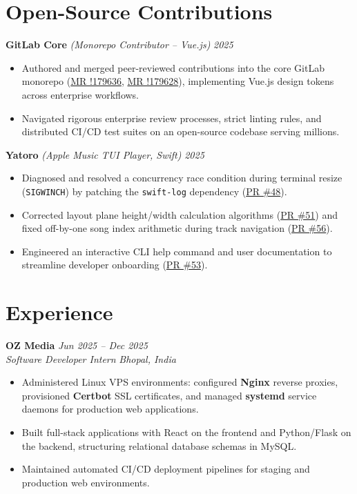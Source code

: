 \documentclass[10pt,a4paper]{article}
\begin{document}
\section{Open-Source Contributions}
\textbf{GitLab Core} \textit{(Monorepo Contributor -- Vue.js)} \hfill \textit{2025}
\begin{itemize}
    \item Authored and merged peer-reviewed contributions into the core GitLab monorepo (\href{https://gitlab.com/gitlab-org/gitlab/-/merge_requests/179636}{MR !179636}, \href{https://gitlab.com/gitlab-org/gitlab/-/merge_requests/179628}{MR !179628}), implementing Vue.js design tokens across enterprise workflows.
    \item Navigated rigorous enterprise review processes, strict linting rules, and distributed CI/CD test suites on an open-source codebase serving millions.
\end{itemize}

\textbf{Yatoro} \textit{(Apple Music TUI Player, Swift)} \hfill \textit{2025}
\begin{itemize}
    \item Diagnosed and resolved a concurrency race condition during terminal resize (\texttt{SIGWINCH}) by patching the \texttt{swift-log} dependency (\href{https://github.com/jayadamsmorgan/Yatoro/pull/48}{PR \#48}).
    \item Corrected layout plane height/width calculation algorithms (\href{https://github.com/jayadamsmorgan/Yatoro/pull/51}{PR \#51}) and fixed off-by-one song index arithmetic during track navigation (\href{https://github.com/jayadamsmorgan/Yatoro/pull/56}{PR \#56}).
    \item Engineered an interactive CLI help command and user documentation to streamline developer onboarding (\href{https://github.com/jayadamsmorgan/Yatoro/pull/53}{PR \#53}).
\end{itemize}

\section{Experience}
\textbf{OZ Media} \hfill \textit{Jun 2025 -- Dec 2025} \\
\textit{Software Developer Intern} \hfill \textit{Bhopal, India}
\begin{itemize}
    \item Administered Linux VPS environments: configured \textbf{Nginx} reverse proxies, provisioned \textbf{Certbot} SSL certificates, and managed \textbf{systemd} service daemons for production web applications.
    \item Built full-stack applications with React on the frontend and Python/Flask on the backend, structuring relational database schemas in MySQL.
    \item Maintained automated CI/CD deployment pipelines for staging and production web environments.
\end{itemize}
\end{document}
